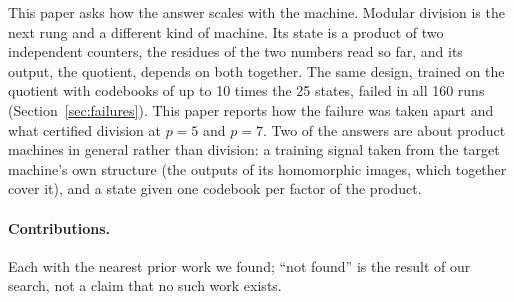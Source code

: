 \documentclass[11pt]{article}
\begin{document}
This paper asks how the answer scales with the machine. Modular division is the next rung and a
different kind of machine. Its state is a product of two
independent counters, the residues of the two numbers read so far, and its output, the quotient,
depends on both together. The same design, trained on the quotient with codebooks of up to 10 times
the 25 states, failed in all 160 runs (Section~\ref{sec:failures}). This paper reports how the
failure was taken apart and what certified division at $p = 5$ and $p = 7$. Two of the answers
are about product machines in general rather than division: a training signal taken from the
target machine's own structure (the outputs of its homomorphic images, which together cover it),
and a state given one codebook per factor of the product.

\paragraph{Contributions.} Each with the nearest prior work we found; ``not found'' is the result of
our search, not a claim that no such work exists.
\end{document}
